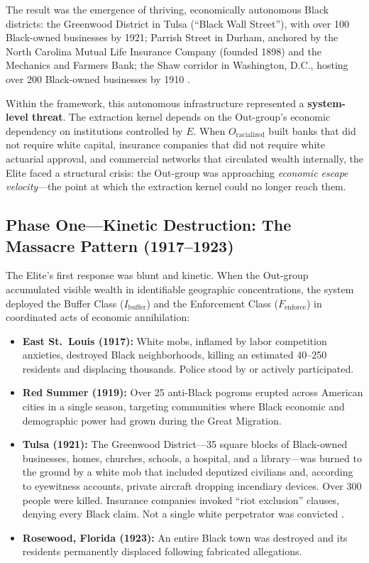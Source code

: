 \documentclass[12pt,openany]{book}
\begin{document}
The result was the emergence of thriving, economically autonomous Black districts: the Greenwood District in Tulsa (``Black Wall Street''), with over 100 Black-owned businesses by 1921; Parrish Street in Durham, anchored by the North Carolina Mutual Life Insurance Company (founded 1898) and the Mechanics and Farmers Bank; the Shaw corridor in Washington, D.C., hosting over 200 Black-owned businesses by 1910 \cite{walker_business, messer_tulsa}.

Within the framework, this autonomous infrastructure represented a \textbf{system-level threat}. The extraction kernel depends on the Out-group's economic dependency on institutions controlled by $E$. When $O_{\text{racialized}}$ built banks that did not require white capital, insurance companies that did not require white actuarial approval, and commercial networks that circulated wealth internally, the Elite faced a structural crisis: the Out-group was approaching \textit{economic escape velocity}---the point at which the extraction kernel could no longer reach them.

\subsection{Phase One---Kinetic Destruction: The Massacre Pattern (1917--1923)}

The Elite's first response was blunt and kinetic. When the Out-group accumulated visible wealth in identifiable geographic concentrations, the system deployed the Buffer Class ($I_{\text{buffer}}$) and the Enforcement Class ($F_{\text{enforce}}$) in coordinated acts of economic annihilation:

\begin{itemize}
    \item \textbf{East St.\ Louis (1917):} White mobs, inflamed by labor competition anxieties, destroyed Black neighborhoods, killing an estimated 40--250 residents and displacing thousands. Police stood by or actively participated.

    \item \textbf{Red Summer (1919):} Over 25 anti-Black pogroms erupted across American cities in a single season, targeting communities where Black economic and demographic power had grown during the Great Migration.

    \item \textbf{Tulsa (1921):} The Greenwood District---35 square blocks of Black-owned businesses, homes, churches, schools, a hospital, and a library---was burned to the ground by a white mob that included deputized civilians and, according to eyewitness accounts, private aircraft dropping incendiary devices. Over 300 people were killed. Insurance companies invoked ``riot exclusion'' clauses, denying every Black claim. Not a single white perpetrator was convicted \cite{messer_tulsa}.

    \item \textbf{Rosewood, Florida (1923):} An entire Black town was destroyed and its residents permanently displaced following fabricated allegations.
\end{itemize}
\end{document}
